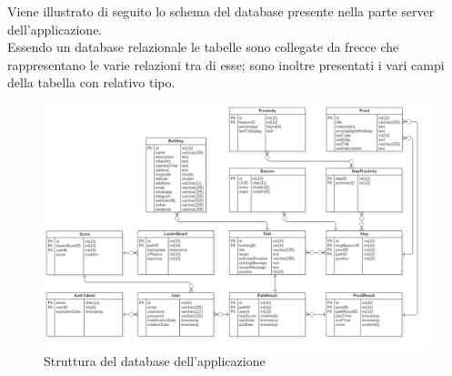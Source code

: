 Viene illustrato di seguito lo schema del database  presente nella parte server dell'applicazione.\\
Essendo un database relazionale le tabelle sono collegate da frecce che rappresentano le varie relazioni tra di esse; sono inoltre presentati i vari campi della tabella con relativo tipo.

\begin{figure}[!h]
	\centering
	\includegraphics[scale=0.33]{img/Database_Schema}
	\caption{Struttura del database dell'applicazione}
\end{figure}
